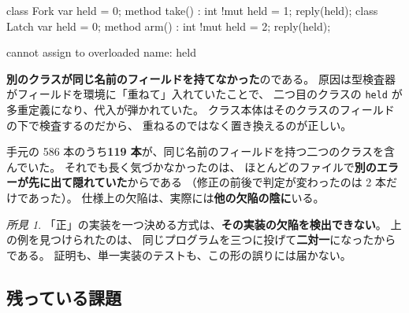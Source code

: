 \documentclass[11pt,a4paper]{ltjsarticle}
\theoremstyle{definition}
\theoremstyle{remark}
\newtheorem{finding}[theorem]{所見}
\begin{document}
\begin{aipl}
class Fork  { var held = 0; method take() : int !{mut} { held = 1; reply(held); } }
class Latch { var held = 0; method arm()  : int !{mut} { held = 2; reply(held); } }
\end{aipl}
\begin{term}
 cannot assign to overloaded name: held
\end{term}

\textbf{別のクラスが同じ名前のフィールドを持てなかった}のである。
原因は型検査器がフィールドを環境に「重ねて」入れていたことで、
二つ目のクラスの \texttt{held} が多重定義になり、代入が弾かれていた。
クラス本体はそのクラスのフィールドの下で検査するのだから、
重ねるのではなく置き換えるのが正しい。

手元の 586 本のうち\textbf{119 本}が、同じ名前のフィールドを持つ二つのクラスを含んでいた。
それでも長く気づかなかったのは、
ほとんどのファイルで\textbf{別のエラーが先に出て隠れていた}からである
（修正の前後で判定が変わったのは 2 本だけであった）。
仕様上の欠陥は、実際には\textbf{他の欠陥の陰に}いる。

\begin{finding}
「正」の実装を一つ決める方式は、\textbf{その実装の欠陥を検出できない}。
上の例を見つけられたのは、
同じプログラムを三つに投げて\textbf{二対一}になったからである。
証明も、単一実装のテストも、この形の誤りには届かない。
\end{finding}

\subsection{残っている課題}
\end{document}

